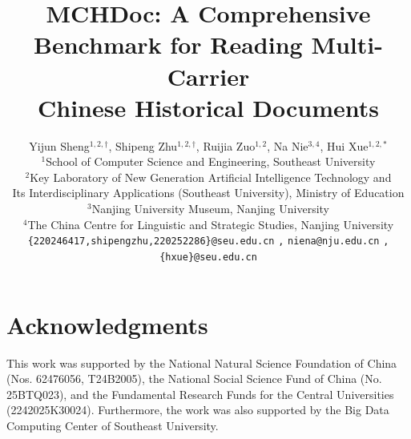 \documentclass[10pt,twocolumn,letterpaper]{article}
\title{MCHDoc: A Comprehensive Benchmark for Reading Multi-Carrier \\ Chinese Historical Documents}
\author{
Yijun Sheng$^{1,2,\dagger}$,
    Shipeng Zhu$^{1,2,\dagger}$, 
    Ruijia Zuo$^{1,2}$, 
    Na Nie$^{3,4}$, 
    Hui Xue$^{1,2,*}$ \\
    $^{1}$School of Computer Science and Engineering, Southeast University \\
    $^{2}$Key Laboratory of New Generation Artificial Intelligence Technology and \\ Its Interdisciplinary Applications  (Southeast University), Ministry of Education \\
    $^{3}$Nanjing University Museum, Nanjing University \\
    $^{4}$The China Centre for Linguistic and Strategic Studies, Nanjing University \\
    {\tt\small \{220246417,shipengzhu,220252286\}@seu.edu.cn} {\tt\small,} {\tt\small niena@nju.edu.cn} {\tt\small,}  {\tt\small \{hxue\}@seu.edu.cn}
}
\begin{document}
\maketitle
{\let\thefootnote\relax{}}
  
    




% 


\section*{Acknowledgments}
This work was supported by the National Natural Science Foundation of China (Nos. 62476056, T24B2005), the National Social Science Fund of China (No. 25BTQ023), and the Fundamental Research Funds for the Central Universities (2242025K30024). Furthermore, the work was also supported by the Big Data Computing Center of Southeast University.
{
    \small
    
    
}

% 
\end{document}
